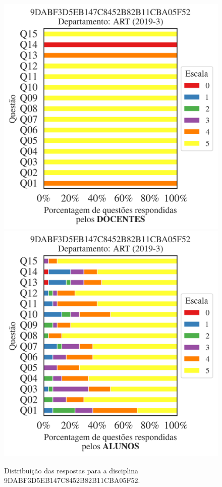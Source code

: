 \documentclass[a4paper,10pt]{article}
\begin{document}
\begin{figure}[h]
\centering
\includegraphics[width=0.485\linewidth]{analise_disciplina_departamento_ART_9DABF3D5EB147C8452B82B11CBA05F52_docentes.png}
\includegraphics[width=0.485\linewidth]{analise_disciplina_departamento_ART_9DABF3D5EB147C8452B82B11CBA05F52_alunos.png}
\caption{\label{fig:analise_geral_departamento}                Distribuição das respostas para a disciplina 9DABF3D5EB147C8452B82B11CBA05F52. }
\end{figure}
\end{document}

